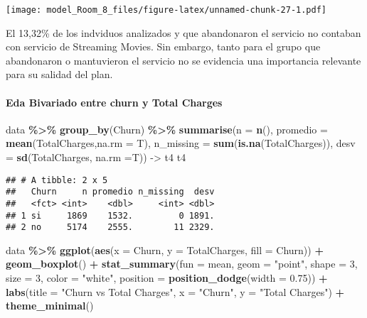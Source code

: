 \documentclass[
]{article}
\newenvironment{Shaded}{\begin{snugshade}}{\end{snugshade}}
\newcommand{\AttributeTok}[1]{\textcolor[rgb]{0.13,0.29,0.53}{#1}}
\newcommand{\DecValTok}[1]{\textcolor[rgb]{0.00,0.00,0.81}{#1}}
\newcommand{\FloatTok}[1]{\textcolor[rgb]{0.00,0.00,0.81}{#1}}
\newcommand{\FunctionTok}[1]{\textcolor[rgb]{0.13,0.29,0.53}{\textbf{#1}}}
\newcommand{\NormalTok}[1]{#1}
\newcommand{\OtherTok}[1]{\textcolor[rgb]{0.56,0.35,0.01}{#1}}
\newcommand{\SpecialCharTok}[1]{\textcolor[rgb]{0.81,0.36,0.00}{\textbf{#1}}}
\newcommand{\StringTok}[1]{\textcolor[rgb]{0.31,0.60,0.02}{#1}}
\begin{document}
\texttt{[image: model\_Room\_8\_files/figure-latex/unnamed-chunk-27-1.pdf]}

El 13,32\% de los indviduos analizados y que abandonaron el servicio no
contaban con servicio de Streaming Movies. Sin embargo, tanto para el
grupo que abandonaron o mantuvieron el servicio no se evidencia una
importancia relevante para su salidad del plan.

\hypertarget{eda-bivariado-entre-churn-y-total-charges}{%
\paragraph{Eda Bivariado entre churn y Total
Charges}\label{eda-bivariado-entre-churn-y-total-charges}}

\begin{Shaded}
\begin{Highlighting}[]
\NormalTok{data }\SpecialCharTok{\%\textgreater{}\%}  \FunctionTok{group\_by}\NormalTok{(Churn) }\SpecialCharTok{\%\textgreater{}\%} 
  \FunctionTok{summarise}\NormalTok{(}\AttributeTok{n =} \FunctionTok{n}\NormalTok{(),}
            \AttributeTok{promedio =} \FunctionTok{mean}\NormalTok{(TotalCharges,}\AttributeTok{na.rm =}\NormalTok{ T),}
            \AttributeTok{n\_missing =} \FunctionTok{sum}\NormalTok{(}\FunctionTok{is.na}\NormalTok{(TotalCharges)),}
            \AttributeTok{desv =} \FunctionTok{sd}\NormalTok{(TotalCharges, }\AttributeTok{na.rm =}\NormalTok{T)) }\OtherTok{{-}\textgreater{}}\NormalTok{ t4}
\NormalTok{t4}
\end{Highlighting}
\end{Shaded}

\begin{verbatim}
## # A tibble: 2 x 5
##   Churn     n promedio n_missing  desv
##   <fct> <int>    <dbl>     <int> <dbl>
## 1 si     1869    1532.         0 1891.
## 2 no     5174    2555.        11 2329.
\end{verbatim}

\begin{Shaded}
\begin{Highlighting}[]
\NormalTok{data }\SpecialCharTok{\%\textgreater{}\%}
  \FunctionTok{ggplot}\NormalTok{(}\FunctionTok{aes}\NormalTok{(}\AttributeTok{x =}\NormalTok{ Churn, }\AttributeTok{y =}\NormalTok{ TotalCharges, }\AttributeTok{fill =}\NormalTok{ Churn)) }\SpecialCharTok{+}
  \FunctionTok{geom\_boxplot}\NormalTok{() }\SpecialCharTok{+}
  \FunctionTok{stat\_summary}\NormalTok{(}\AttributeTok{fun =}\NormalTok{ mean, }\AttributeTok{geom =} \StringTok{"point"}\NormalTok{, }\AttributeTok{shape =} \DecValTok{3}\NormalTok{, }\AttributeTok{size =} \DecValTok{3}\NormalTok{,}
               \AttributeTok{color =} \StringTok{"white"}\NormalTok{, }\AttributeTok{position =} \FunctionTok{position\_dodge}\NormalTok{(}\AttributeTok{width =} \FloatTok{0.75}\NormalTok{)) }\SpecialCharTok{+}
  \FunctionTok{labs}\NormalTok{(}\AttributeTok{title =} \StringTok{"Churn vs Total Charges"}\NormalTok{,}
       \AttributeTok{x =} \StringTok{"Churn"}\NormalTok{,}
       \AttributeTok{y =} \StringTok{"Total Charges"}\NormalTok{) }\SpecialCharTok{+}
        \FunctionTok{theme\_minimal}\NormalTok{()}
\end{Highlighting}
\end{Shaded}
\end{document}
